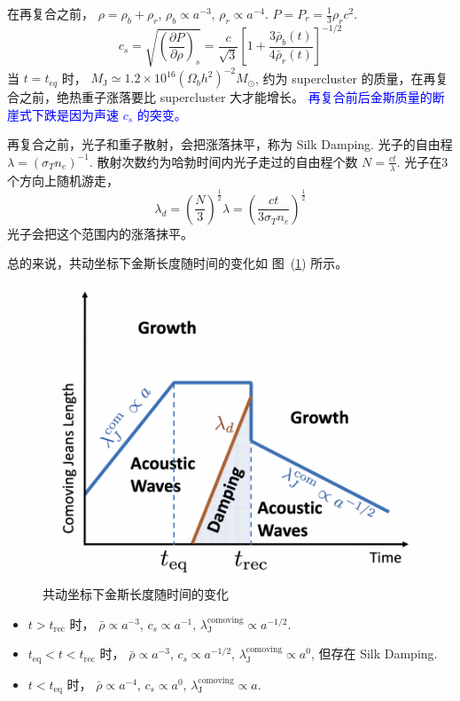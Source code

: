 \documentclass[12pt]{ctexart}
\newcommand{\new}[1]{\textcolor{blue}{#1}}
\newcommand{\reffig}[1]{图~(\ref{#1})}
\begin{document}

在再复合之前， 
$\rho = \rho_b+\rho_r$, $\rho_b\propto a^{-3}$, $\rho_r\propto a^{-4}$. 
$P=P_r=\frac{1}{3}\rho_r c^2$.
\begin{equation}
    c_{s}=\sqrt{\left(\frac{\partial P}{\partial \rho}\right)_{s}}=\frac{c}{\sqrt{3}}\left[1+\frac{3 \bar{\rho}_{b}(t)}{4 \bar{\rho}_{r}(t)}\right]^{-1 / 2}
\end{equation}
当 $t=t_{eq}$ 时，
$M_\text{J} \simeq 1.2\times 10^{16} \left(\Omega_b h^2\right)^{-2} M_\odot$,
约为 supercluster 的质量，在再复合之前，绝热重子涨落要比 supercluster 大才能增长。
\new{再复合前后金斯质量的断崖式下跌是因为声速 $c_s$ 的突变。}

再复合之前，光子和重子散射，会把涨落抹平，称为
Silk Damping.
光子的自由程 $\lambda = \left(\sigma_T n_e\right)^{-1}$.
散射次数约为哈勃时间内光子走过的自由程个数 $N=\frac{ct}{\lambda}$.
光子在3个方向上随机游走，
\begin{equation}
    \lambda_d = \left(\frac{N}{3}\right)^{\frac{1}{2}} \lambda = \left(\frac{ct}{3\sigma_T n_e}\right)^{\frac{1}{2}}
\end{equation}
光子会把这个范围内的涨落抹平。

总的来说，共动坐标下金斯长度随时间的变化如 \reffig{Jeans_scale} 所示。
\begin{figure}[!hbtp]
	\centering
	\includegraphics[width=1.0\linewidth]{Jeans_scale.png}
	\caption{共动坐标下金斯长度随时间的变化} \label{Jeans_scale}
\end{figure}

\begin{itemize}
    \item $t>t_\text{rec}$ 时，  $\bar{\rho}\propto a^{-3}$, $c_s\propto a^{-1}$, $\lambda_\text{J}^\text{comoving} \propto a^{-1/2}$.
    \item $t_\text{eq}<t<t_\text{rec}$ 时，  $\bar{\rho}\propto a^{-3}$, $c_s\propto a^{-1/2}$, $\lambda_\text{J}^\text{comoving} \propto a^{0}$, 但存在 Silk Damping.
    \item $t<t_\text{eq}$ 时， $\bar{\rho}\propto a^{-4}$, $c_s\propto a^{0}$, $\lambda_\text{J}^\text{comoving} \propto a$.
\end{itemize}
\end{document}

